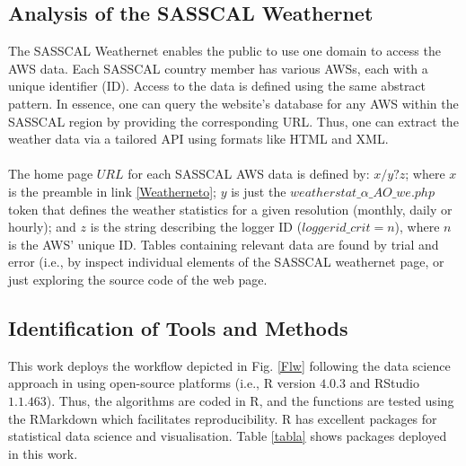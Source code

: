 \documentclass[a4paper, 10pt, conference]{ieeeconf}      %
\begin{document}
\subsection{\textbf{Analysis of the SASSCAL Weathernet}}
\noindent
The SASSCAL Weathernet   enables the public to use one domain to access the AWS data.
Each SASSCAL country member  has various AWSs,  each   with a unique   identifier (ID). 
Access to the      data  is defined using the same abstract pattern.
 In essence,  one can query the website’s database for any AWS within the SASSCAL region by providing the  corresponding URL.
 Thus, one can extract the weather data via a tailored API using formats like HTML and XML. 
\\
\\
 The  home page  $URL$ for each SASSCAL AWS data is	defined by: $x/y?z$; where
%
$x$ is the preamble in link  \ref{Weatherneto};
$y$ is just the $weatherstat\_\alpha\_AO\_we.php$ token that defines the weather statistics for a given  resolution (monthly, daily or hourly); and $z$ is the string describing the logger ID ($loggerid\_crit=n$), where $n$ is the AWS' unique  ID.  Tables containing  relevant data   are found by trial and error (i.e., by   inspect individual elements of the SASSCAL weathernet page, or just exploring  the source code of the web page. %

\subsection{\textbf{Identification of Tools and Methods}}
\noindent
	This work deploys the workflow depicted in Fig. \ref{Flw} following the data science approach in \cite{wickham2016r,bradley2019web}  %
 using open-source platforms (i.e., R version $4.0.3$ and RStudio $1.1.463$). 
Thus, the algorithms are coded in R, and the functions are tested using the RMarkdown which facilitates  reproducibility.
 R   has  excellent packages for  statistical data science and visualisation. Table \ref{tabla} shows   packages deployed in this work.
\end{document}
